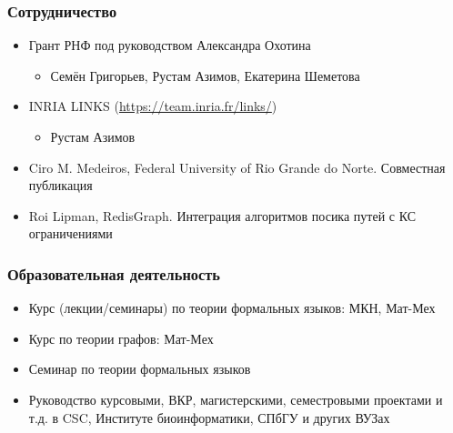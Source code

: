 \documentclass[xcolor=table]{beamer}
\begin{document}
\begin{frame}[fragile]

  \frametitle{Сотрудничество}
\begin{itemize}
      \item Грант РНФ под руководством Александра Охотина
      \begin{itemize}
        \item Семён Григорьев, Рустам Азимов, Екатерина Шеметова
      \end{itemize}
      \item INRIA LINKS (\url{https://team.inria.fr/links/})
      \begin{itemize}
         \item Рустам Азимов     
      \end{itemize}
      \item Ciro M. Medeiros, Federal University of Rio Grande do Norte. Совместная публикация
      \item Roi Lipman, RedisGraph. Интеграция алгоритмов посика путей с КС ограничениями

\end{itemize}
\end{frame}

\begin{frame}[fragile]

  \frametitle{Образовательная деятельность}
\begin{itemize}
      \item Курс (лекции/семинары) по теории формальных языков: МКН, Мат-Мех
      \item Курс по теории графов: Мат-Мех
      \item Семинар по теории формальных языков
      \item Руководство курсовыми, ВКР, магистерскими, семестровыми проектами и т.д. в CSC, Институте биоинформатики, СПбГУ и других ВУЗах
\end{itemize}
\end{frame}
\end{document}
